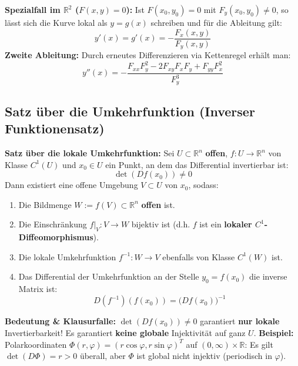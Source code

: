 \begin{lemma}
    \textbf{Spezialfall im $\mathbb{R}^2$ ($F(x, y) = 0$):}
    Ist $F(x_0, y_0) = 0$ mit $F_y(x_0, y_0) \neq 0$, so lässt sich die Kurve lokal als $y = g(x)$ schreiben und für die Ableitung gilt:
    $$ y'(x) = g'(x) = - \frac{F_x(x, y)}{F_y(x, y)} $$
    \textbf{Zweite Ableitung:} Durch erneutes Differenzieren via Kettenregel erhält man:
    $$ y''(x) = - \frac{F_{xx} F_y^2 - 2 F_{xy} F_x F_y + F_{yy} F_x^2}{F_y^3} $$
\end{lemma}

\subsection{Satz über die Umkehrfunktion (Inverser Funktionensatz)}

\begin{theorem}
    \textbf{Satz über die lokale Umkehrfunktion:}
    Sei $U \subset \mathbb{R}^n$ \textbf{offen}, $f: U \to \mathbb{R}^n$ von Klasse $C^1(U)$ und $x_0 \in U$ ein Punkt, an dem das Differential invertierbar ist:
    $$ \det(Df(x_0)) \neq 0 $$
    Dann existiert eine offene Umgebung $V \subset U$ von $x_0$, sodass:
    \begin{enumerate}
        \item Die Bildmenge $W := f(V) \subset \mathbb{R}^n$ \textbf{offen} ist.
        \item Die Einschränkung $f|_V: V \to W$ bijektiv ist (d.h. $f$ ist ein \textbf{lokaler $C^1$-Diffeomorphismus}).
        \item Die lokale Umkehrfunktion $f^{-1}: W \to V$ ebenfalls von Klasse $C^1(W)$ ist.
        \item Das Differential der Umkehrfunktion an der Stelle $y_0 = f(x_0)$ die inverse Matrix ist:
        $$ D(f^{-1})(f(x_0)) = \big( Df(x_0) \big)^{-1} $$
    \end{enumerate}
\end{theorem}

\begin{remark}
    \textbf{Bedeutung \& Klausurfalle:}
    $\det(Df(x_0)) \neq 0$ garantiert \textbf{nur lokale} Invertierbarkeit! Es garantiert \textbf{keine globale} Injektivität auf ganz $U$.
    \textbf{Beispiel:} Polarkoordinaten $\Phi(r, \varphi) = (r\cos\varphi, r\sin\varphi)^T$ auf $(0, \infty) \times \mathbb{R}$: Es gilt $\det(D\Phi) = r > 0$ überall, aber $\Phi$ ist global nicht injektiv (periodisch in $\varphi$).
\end{remark}

